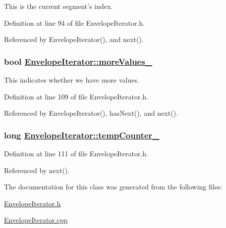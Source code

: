 This is the current segment's index. 

Definition at line 94 of file Envelope\-Iterator.h.

Referenced by Envelope\-Iterator(), and next().\hypertarget{classEnvelopeIterator_r4}{
\subsubsection[moreValues\_\-]{\setlength{\rightskip}{0pt plus 5cm}bool \hyperlink{classEnvelopeIterator_r4}{Envelope\-Iterator::more\-Values\_\-}}}
\label{classEnvelopeIterator_r4}


This indicates whether we have more values. 

Definition at line 109 of file Envelope\-Iterator.h.

Referenced by Envelope\-Iterator(), has\-Next(), and next().\hypertarget{classEnvelopeIterator_r5}{
\subsubsection[tempCounter\_\-]{\setlength{\rightskip}{0pt plus 5cm}long \hyperlink{classEnvelopeIterator_r5}{Envelope\-Iterator::temp\-Counter\_\-}}}
\label{classEnvelopeIterator_r5}




Definition at line 111 of file Envelope\-Iterator.h.

Referenced by next().

The documentation for this class was generated from the following files:\begin{CompactItemize}
\item 
\hyperlink{EnvelopeIterator_8h}{Envelope\-Iterator.h}\item 
\hyperlink{EnvelopeIterator_8cpp}{Envelope\-Iterator.cpp}\end{CompactItemize}
